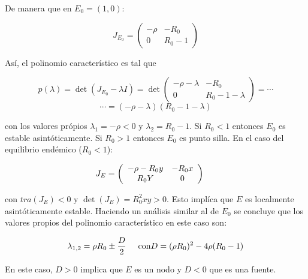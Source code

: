 \documentclass[10pt,oneside]{article}
\begin{document}
\begin{multicols}{2}
    De manera que en $E_0=(1,0):$
    
    $$J_{E_0}=\left(\begin{array}{cc}
       -\rho  & -R_0 \\
       0 & R_0-1
    \end{array}\right)$$

    Así, el polinomio característico es tal que

    $$p(\lambda)=\det (J_{E_0}-\lambda I)=\det \left(\begin{array}{cc}
       -\rho-\lambda  & -R_0 \\
       0 & R_0-1-\lambda
    \end{array}\right)=\cdots$$
    $$\cdots=(-\rho-\lambda)(R_0-1-\lambda)$$

    con los valores própios $\lambda_1=-\rho<0$ y $\lambda_2=R_0-1$. Si $R_0<1$ entonces $E_0$ es estable asintóticamente. Si $R_0>1$ entonces  $E_0$ es punto silla. \newline En el caso del equilibrio endémico ($R_0<1$):
    
    $$J_{E}=\left(\begin{array}{cc}
       -\rho-R_0y  & -R_0x \\
       R_0Y & 0
    \end{array}\right)\hspace{0.5cm}$$

    con $tra(J_{E})<0$ y $\det(J_E)=R_0^2xy>0$. Esto implíca que $E$ es localmente asintóticamente estable. Haciendo un análisis similar al de $E_0$ se concluye que los valores propios del polinomio característico en este caso son:

    $$\lambda_{1,2}=\rho R_0 \pm \frac{D}{2}\hspace{0.5cm} \textnormal{con} D=(\rho R_0)^2-4\rho(R_0-1)$$

    En este caso, $D>0$ implica que $E$ es un nodo y $D<0$ que es una fuente.
    

    

    

    



    

   
\end{multicols}
    

    
\end{document}
